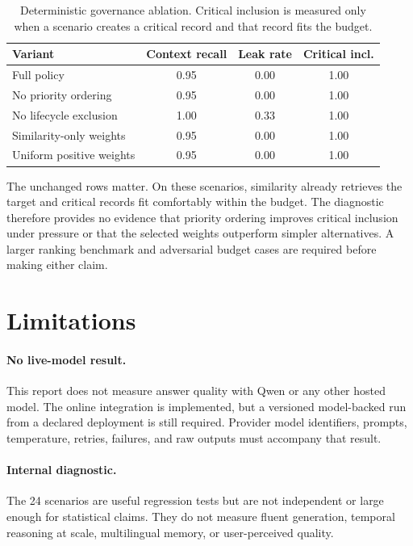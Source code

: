 \documentclass[11pt]{article}
\begin{document}
\begin{table}[tbp]
\centering
\small
\caption{Deterministic governance ablation. Critical inclusion is measured only
when a scenario creates a critical record and that record fits the budget.}
\label{tab:ablation}
\begin{tabular}{@{}lccc@{}}
\toprule
\textbf{Variant} & \textbf{Context recall} & \textbf{Leak rate} & \textbf{Critical incl.} \\
\midrule
Full policy & 0.95 & 0.00 & 1.00 \\
No priority ordering & 0.95 & 0.00 & 1.00 \\
No lifecycle exclusion & 1.00 & 0.33 & 1.00 \\
Similarity-only weights & 0.95 & 0.00 & 1.00 \\
Uniform positive weights & 0.95 & 0.00 & 1.00 \\
\bottomrule
\end{tabular}
\end{table}

The unchanged rows matter. On these scenarios, similarity already retrieves
the target and critical records fit comfortably within the budget. The
diagnostic therefore provides no evidence that priority ordering improves
critical inclusion under pressure or that the selected weights outperform
simpler alternatives. A larger ranking benchmark and adversarial budget cases
are required before making either claim.

\section{Limitations}
\label{sec:limitations}

\paragraph{No live-model result.}
This report does not measure answer quality with Qwen or any other hosted model.
The online integration is implemented, but a versioned model-backed run from a
declared deployment is still required. Provider model identifiers, prompts,
temperature, retries, failures, and raw outputs must accompany that result.

\paragraph{Internal diagnostic.}
The 24 scenarios are useful regression tests but are not independent or large
enough for statistical claims. They do not measure fluent generation, temporal
reasoning at scale, multilingual memory, or user-perceived quality.
\end{document}
